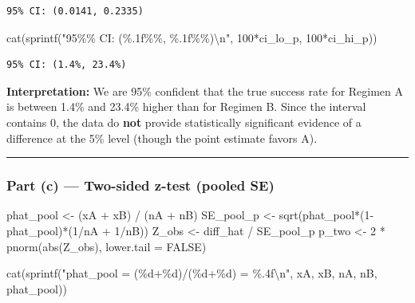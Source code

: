 \documentclass[
  letterpaper,
  DIV=11,
  numbers=noendperiod]{scrartcl}
\newenvironment{Shaded}{\begin{snugshade}}{\end{snugshade}}
\newcommand{\AttributeTok}[1]{\textcolor[rgb]{0.40,0.45,0.13}{#1}}
\newcommand{\ConstantTok}[1]{\textcolor[rgb]{0.56,0.35,0.01}{#1}}
\newcommand{\DecValTok}[1]{\textcolor[rgb]{0.68,0.00,0.00}{#1}}
\newcommand{\FunctionTok}[1]{\textcolor[rgb]{0.28,0.35,0.67}{#1}}
\newcommand{\NormalTok}[1]{\textcolor[rgb]{0.00,0.23,0.31}{#1}}
\newcommand{\OtherTok}[1]{\textcolor[rgb]{0.00,0.23,0.31}{#1}}
\newcommand{\SpecialCharTok}[1]{\textcolor[rgb]{0.37,0.37,0.37}{#1}}
\newcommand{\StringTok}[1]{\textcolor[rgb]{0.13,0.47,0.30}{#1}}
\begin{document}
\begin{verbatim}
95% CI: (0.0141, 0.2335)
\end{verbatim}

\begin{Shaded}
\begin{Highlighting}[]
\FunctionTok{cat}\NormalTok{(}\FunctionTok{sprintf}\NormalTok{(}\StringTok{"95\%\% CI: (\%.1f\%\%, \%.1f\%\%)}\SpecialCharTok{\textbackslash{}n}\StringTok{"}\NormalTok{, }\DecValTok{100}\SpecialCharTok{*}\NormalTok{ci\_lo\_p, }\DecValTok{100}\SpecialCharTok{*}\NormalTok{ci\_hi\_p))}
\end{Highlighting}
\end{Shaded}

\begin{verbatim}
95% CI: (1.4%, 23.4%)
\end{verbatim}

\textbf{Interpretation:} We are 95\% confident that the true success
rate for Regimen A is between 1.4\% and 23.4\% higher than for Regimen
B. Since the interval contains 0, the data do \textbf{not} provide
statistically significant evidence of a difference at the 5\% level
(though the point estimate favors A).

\begin{center}\rule{0.5\linewidth}{0.5pt}\end{center}

\subsubsection{Part (c) --- Two-sided z-test (pooled
SE)}\label{part-c-two-sided-z-test-pooled-se}

\begin{Shaded}
\begin{Highlighting}[]
\NormalTok{phat\_pool }\OtherTok{\textless{}{-}}\NormalTok{ (xA }\SpecialCharTok{+}\NormalTok{ xB) }\SpecialCharTok{/}\NormalTok{ (nA }\SpecialCharTok{+}\NormalTok{ nB)}
\NormalTok{SE\_pool\_p }\OtherTok{\textless{}{-}} \FunctionTok{sqrt}\NormalTok{(phat\_pool}\SpecialCharTok{*}\NormalTok{(}\DecValTok{1}\SpecialCharTok{{-}}\NormalTok{phat\_pool)}\SpecialCharTok{*}\NormalTok{(}\DecValTok{1}\SpecialCharTok{/}\NormalTok{nA }\SpecialCharTok{+} \DecValTok{1}\SpecialCharTok{/}\NormalTok{nB))}
\NormalTok{Z\_obs     }\OtherTok{\textless{}{-}}\NormalTok{ diff\_hat }\SpecialCharTok{/}\NormalTok{ SE\_pool\_p}
\NormalTok{p\_two     }\OtherTok{\textless{}{-}} \DecValTok{2} \SpecialCharTok{*} \FunctionTok{pnorm}\NormalTok{(}\FunctionTok{abs}\NormalTok{(Z\_obs), }\AttributeTok{lower.tail =} \ConstantTok{FALSE}\NormalTok{)}

\FunctionTok{cat}\NormalTok{(}\FunctionTok{sprintf}\NormalTok{(}\StringTok{"phat\_pool = (\%d+\%d)/(\%d+\%d) = \%.4f}\SpecialCharTok{\textbackslash{}n}\StringTok{"}\NormalTok{, xA, xB, nA, nB, phat\_pool))}
\end{Highlighting}
\end{Shaded}
\end{document}
